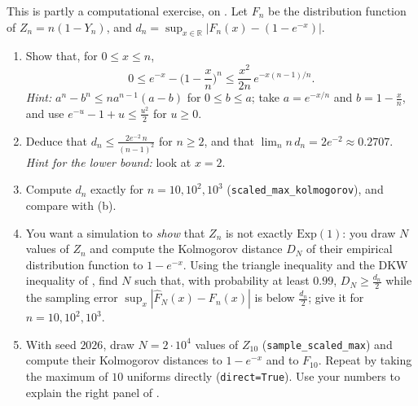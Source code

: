 \begin{exercise}\label{ex:cl-maximum-rate}
\hard This is partly a computational exercise, on . Let $F_n$ be the
distribution function of $Z_n=n(1-Y_n)$, and
$d_n=\sup_{x\in\mathbb R}|F_n(x)-(1-e^{-x})|$.
\begin{enumerate}[label=(\alph*)]
  \item Show that, for $0\le x\le n$,
    \[
      0\le e^{-x}-\Big(1-\frac xn\Big)^n\le\frac{x^2}{2n}\,e^{-x(n-1)/n} .
    \]
    \emph{Hint:} $a^n-b^n\le na^{n-1}(a-b)$ for $0\le b\le a$; take $a=e^{-x/n}$ and
    $b=1-\frac xn$, and use $e^{-u}-1+u\le\frac{u^2}2$ for $u\ge0$.
  \item Deduce that $d_n\le\frac{2e^{-2}\,n}{(n-1)^2}$ for $n\ge2$, and that
    $\lim_nn\,d_n=2e^{-2}\approx0.2707$. \emph{Hint for the lower bound:} look at $x=2$.
  \item Compute $d_n$ exactly for $n=10,10^2,10^3$ (\texttt{scaled\_max\_kolmogorov}), and
    compare with (b).
  \item You want a simulation to \emph{show} that $Z_n$ is not exactly $\mathrm{Exp}(1)$: you draw
    $N$ values of $Z_n$ and compute the Kolmogorov distance $D_N$ of their empirical distribution
    function to $1-e^{-x}$. Using the triangle inequality and the DKW inequality of
    , find $N$ such that, with probability at least $0.99$, $D_N\ge\frac{d_n}2$
    while the sampling error $\sup_x|\hat F_N(x)-F_n(x)|$ is below $\frac{d_n}2$; give it for
    $n=10,10^2,10^3$.
  \item With seed $2026$, draw $N=2\cdot10^4$ values of $Z_{10}$ (\texttt{sample\_scaled\_max}) and
    compute their Kolmogorov distances to $1-e^{-x}$ and to $F_{10}$. Repeat by taking the maximum
    of $10$ uniforms directly (\texttt{direct=True}). Use your numbers to explain the right
    panel of .
\end{enumerate}
\end{exercise}

